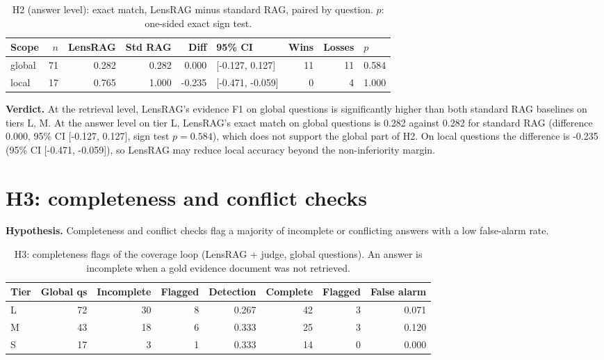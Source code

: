 \documentclass[11pt]{article}
\begin{document}
\begin{table}[htbp]
\centering\small
\caption{H2 (answer level): exact match, LensRAG minus standard RAG, paired by question. $p$: one-sided exact sign test.}
\label{tab:h2pair}
\begin{tabular}{lrrrrlrrl}
\toprule
Scope & $n$ & LensRAG & Std RAG & Diff & 95\% CI & Wins & Losses & $p$ \\
\midrule
global & 71 & 0.282 & 0.282 & 0.000 & [-0.127, 0.127] & 11 & 11 & 0.584 \\
local & 17 & 0.765 & 1.000 & -0.235 & [-0.471, -0.059] & 0 & 4 & 1.000 \\
\bottomrule
\end{tabular}
\end{table}

\textbf{Verdict.} At the retrieval level, LensRAG's evidence F1 on global questions is significantly higher than both standard RAG baselines on tiers L, M. At the answer level on tier L, LensRAG's exact match on global questions is 0.282 against 0.282 for standard RAG (difference 0.000, 95\% CI [-0.127, 0.127], sign test $p=0.584$), which does not support the global part of H2. On local questions the difference is -0.235 (95\% CI [-0.471, -0.059]), so LensRAG may reduce local accuracy beyond the non-inferiority margin. 

\section{H3: completeness and conflict checks}

\textbf{Hypothesis.} Completeness and conflict checks flag a majority of incomplete or conflicting answers with a low false-alarm rate.

\begin{table}[htbp]
\centering\small
\caption{H3: completeness flags of the coverage loop (LensRAG + judge, global questions). An answer is incomplete when a gold evidence document was not retrieved.}
\label{tab:h3}
\begin{tabular}{lrrrrrrr}
\toprule
Tier & Global qs & Incomplete & Flagged & Detection & Complete & Flagged & False alarm \\
\midrule
L & 72 & 30 & 8 & 0.267 & 42 & 3 & 0.071 \\
M & 43 & 18 & 6 & 0.333 & 25 & 3 & 0.120 \\
S & 17 & 3 & 1 & 0.333 & 14 & 0 & 0.000 \\
\bottomrule
\end{tabular}
\end{table}
\end{document}
